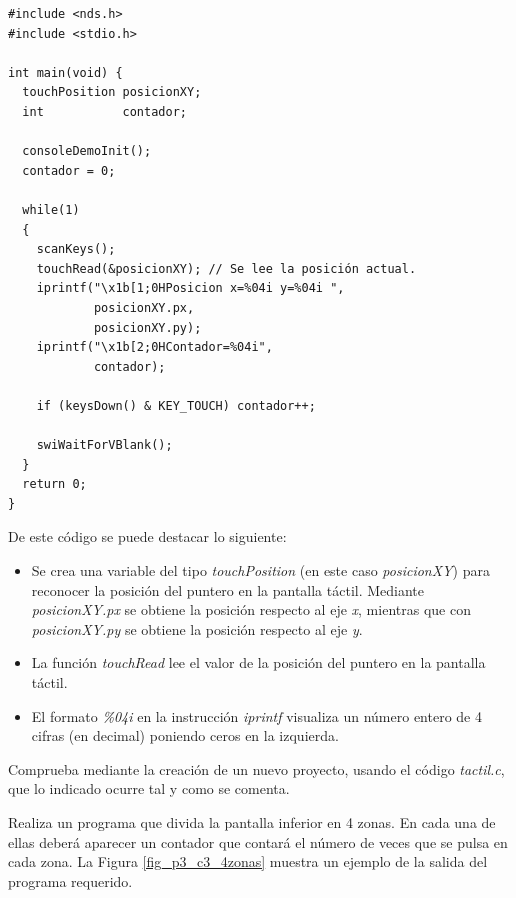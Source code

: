 \begin{lstlisting}
#include <nds.h>
#include <stdio.h>

int main(void) {
  touchPosition posicionXY;
  int           contador;

  consoleDemoInit();
  contador = 0;

  while(1)
  {
    scanKeys();
    touchRead(&posicionXY); // Se lee la posición actual.
    iprintf("\x1b[1;0HPosicion x=%04i y=%04i ",
            posicionXY.px, 
            posicionXY.py);
    iprintf("\x1b[2;0HContador=%04i", 
            contador);

    if (keysDown() & KEY_TOUCH) contador++;

    swiWaitForVBlank();
  }
  return 0;
}
\end{lstlisting}

De este código se puede destacar lo siguiente:
\begin{itemize}
\item Se crea una variable del tipo \textit{touchPosition} (en este caso \textit{posicionXY}) para reconocer la posición del puntero en la pantalla táctil. Mediante \textit{posicionXY.px} se obtiene la posición respecto al eje \textit{x}, mientras que con \textit{posicionXY.py} se obtiene la posición respecto al eje \textit{y}.
%
\item La función \textit{touchRead} lee el valor de la posición del puntero en la pantalla táctil.
%
\item El formato \textit{\%04i} en la instrucción \textit{iprintf}  visualiza un número entero de 4 cifras (en decimal)  poniendo ceros en la izquierda. 
\end{itemize}

\begin{exercise}
	Comprueba mediante la creación de un nuevo proyecto, usando el código \textit{tactil.c}, que lo indicado ocurre tal y como se comenta.
\end{exercise}

\begin{exercise}
Realiza un programa que divida la pantalla inferior en 4 zonas. En cada una de ellas deberá aparecer un contador que contará el número de veces que se pulsa en cada zona. La Figura \ref{fig_p3_c3_4zonas} muestra un ejemplo de la salida del programa requerido.
\end{exercise}

